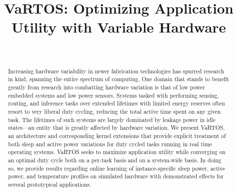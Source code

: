 \documentclass[conference]{IEEEtran}
\begin{document}
\title{VaRTOS: Optimizing Application Utility with Variable Hardware }



\author{
\\
\vspace{5mm}
}


\maketitle


\begin{abstract}

Increasing hardware variability in newer fabrication technologies has spurred research in kind, spanning the entire spectrum of computing.  One domain that stands to benefit greatly from research into combatting hardware variation is that of low power embedded systems and low power sensors. Systems tasked with performing sensing, routing, and inference tasks over extended lifetimes with limited energy reserves often resort to very liberal duty cycling, reducing the total active time spent on any given task.  The lifetimes of such systems are largely dominated by leakage power in idle states---an entity that is greatly affected by hardware variation. We present VaRTOS, an architecture and corresponding kernel extensions that provide explicit treatment of both sleep and active power variations for duty cycled tasks running in real time operating systems. VaRTOS seeks to maximize application utility while converging on an optimal duty cycle both on a per-task basis and on a system-wide basis.  In doing so, we provide results regarding online learning of instance-specific sleep power, active power, and temperature profiles on simulated hardware with demonstrated effects for several prototypical applications. 

\end{abstract}

\IEEEpeerreviewmaketitle
\end{document}
